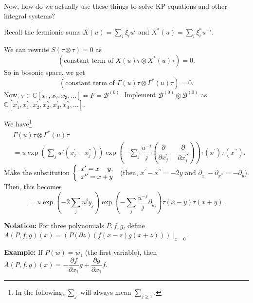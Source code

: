 \documentclass
[numbers=enddot,12pt,final,onecolumn,german,notitlepage]{scrartcl}%
\theoremstyle{definition}
\begin{document}
Now, how do we actually use these things to solve KP equations and other
integral systems?

Recall the fermionic sums $X\left(  u\right)  =\sum\limits_{i}\xi_{i}u^{i}$
and $X^{\ast}\left(  u\right)  =\sum\limits_{i}\xi_{i}^{\ast}u^{-i}$.

We can rewrite $S\left(  \tau\otimes\tau\right)  =0$ as
\[
\left(  \text{constant term of }X\left(  u\right)  \tau\otimes X^{\ast}\left(
u\right)  \tau\right)  =0.
\]
So in bosonic space, we get
\[
\left(  \text{constant term of }\Gamma\left(  u\right)  \tau\otimes
\Gamma^{\ast}\left(  u\right)  \tau\right)  =0.
\]
Now, $\tau\in\mathbb{C}\left[  x_{1},x_{2},x_{3},...\right]  =F=\mathcal{B}%
^{\left(  0\right)  }$. Implement $\mathcal{B}^{\left(  0\right)  }%
\otimes\mathcal{B}^{\left(  0\right)  }$ as $\mathbb{C}\left[  x_{1}^{\prime
},x_{1}^{\prime\prime},x_{2}^{\prime},x_{2}^{\prime\prime},x_{3}^{\prime
},x_{3}^{\prime\prime},...\right]  $.

We have\footnote{In the following, $\sum\limits_{j}$ will always mean
$\sum\limits_{j\geq1}$.}%
\begin{align*}
&  \Gamma\left(  u\right)  \tau\otimes\Gamma^{\ast}\left(  u\right)  \tau\\
&  =u\exp\left(  \sum\limits_{j}u^{j}\left(  x_{j}^{\prime}-x_{j}%
^{\prime\prime}\right)  \right)  \exp\left(  -\sum\limits_{j}\dfrac{u^{-j}}%
{j}\left(  \dfrac{\partial}{\partial x_{j}^{\prime}}-\dfrac{\partial}{\partial
x_{j}^{\prime\prime}}\right)  \right)  \tau\left(  x^{\prime}\right)
\tau\left(  x^{\prime\prime}\right)  .
\end{align*}
Make the substitution $\left\{
\begin{array}
[c]{c}%
x^{\prime}=x-y;\\
x^{\prime\prime}=x+y
\end{array}
\right.  $ (then, $x^{\prime}-x^{\prime\prime}=-2y$ and $\partial_{x^{\prime}%
}-\partial_{x^{\prime\prime}}=-\partial_{y}$). Then, this becomes%
\[
=u\exp\left(  -2\sum\limits_{j}u^{j}y_{j}\right)  \exp\left(  -\sum
\limits_{j}\dfrac{u^{-j}}{j}\partial_{y_{j}}\right)  \tau\left(  x-y\right)
\tau\left(  x+y\right)  .
\]


\textbf{Notation:} For three polynomials $P,f,g$, define $A\left(
P,f,g\right)  \left(  x\right)  =\left(  P\left(  \partial z\right)  \left(
f\left(  x-z\right)  g\left(  x+z\right)  \right)  \right)  \mid_{z=0}$.

\textbf{Example:} If $P\left(  w\right)  =w_{1}$ (the first variable), then
$A\left(  P,f,g\right)  \left(  x\right)  =-\dfrac{\partial f}{\partial x_{1}%
}g+\dfrac{\partial g}{\partial x_{1}}f$.
\end{document}
